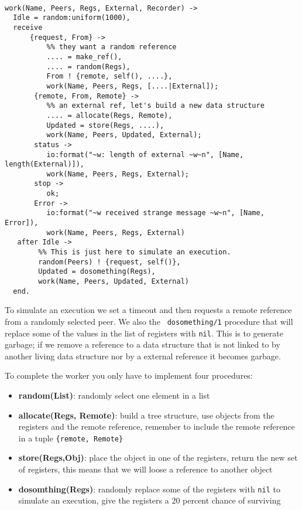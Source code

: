\documentclass[a4paper,11pt]{article}
\begin{document}
\begin{verbatim}

work(Name, Peers, Regs, External, Recorder) ->
  Idle = random:uniform(1000),
  receive
      {request, From} ->
          %% they want a random reference
          .... = make_ref(),
          .... = random(Regs),
          From ! {remote, self(), ....},
          work(Name, Peers, Regs, [....|External]);
       {remote, From, Remote} ->
          %% an external ref, let's build a new data structure
          .... = allocate(Regs, Remote),
          Updated = store(Regs, ....),
          work(Name, Peers, Updated, External);
       status ->
          io:format("~w: length of external ~w~n", [Name, length(External)]),
          work(Name, Peers, Regs, External);     
       stop ->
          ok;
       Error ->
          io:format("~w received strange message ~w~n", [Name, Error]),
          work(Name, Peers, Regs, External)
   after Idle ->
        %% This is just here to simulate an execution. 
        random(Peers) ! {request, self()},
        Updated = dosomething(Regs),
        work(Name, Peers, Updated, External)
  end.
\end{verbatim}

To simulate an execution we set a timeout and then requests a remote
reference from a randomly selected peer. We also the {\tt
dosomething/1} procedure that will replace some of the values in the
list of registers with {\tt nil}. This is to generate garbage; if we
remove a reference to a data structure that is not linked to by another
living data structure nor by a external reference it becomes garbage.


To complete the worker you only have to implement four procedures:

\begin{itemize}
\item {\bf random(List)}: randomly select one element in a list

\item {\bf allocate(Regs, Remote)}: build a tree structure, use
objects from the registers and the remote reference, remember to
include the remote reference in a tuple {\tt \{remote, Remote\}}

\item {\bf store(Regs,Obj)}: place the object in one of the registers,
return the new set of registers, this means that we will loose a
reference to another object

\item {\bf dosomthing(Regs)}: randomly replace some of the registers
with {\tt nil} to simulate an execution, give the registers a 20 percent chance 
of surviving

\end{itemize}
\end{document}
